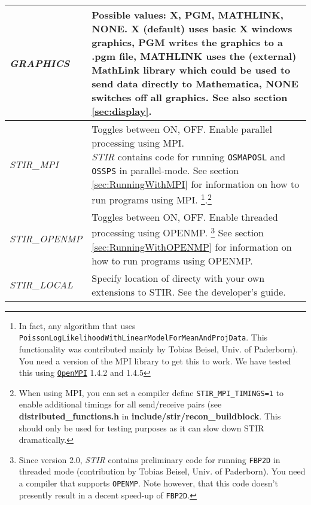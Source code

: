 \documentclass{article}
\def\R2Lurl#1#2{\mbox{\href{#1}{\tt #2}}}
\begin{document}
\begin{longtable}{|p{\MakeTableFirstCol}|p{\MakeTableSecondCol}|}
\hline
{\raggedright \textit{GRAPHICS}} & 
{\raggedright Possible values: X, PGM, MATHLINK, NONE. X (default) uses basic 
X windows graphics, PGM writes the graphics to a .pgm file, MATHLINK 
uses the (external) MathLink library which could be used to send 
data directly to Mathematica, NONE switches off all graphics. See also section \ref{sec:display}.
} \\
\hline
{\raggedright \textit{STIR\_MPI}} & 
{\raggedright Toggles between ON, OFF. Enable parallel processing using MPI.\\
\textit{STIR} contains code for running \texttt{OSMAPOSL} and \texttt{OSSPS} in parallel-mode. 
See section \ref{sec:RunningWithMPI} for information on how to run programs using MPI.
\footnote{In fact, any algorithm that uses \texttt{PoissonLogLikelihoodWithLinearModelForMeanAndProjData}.
This functionality was contributed mainly by Tobias Beisel, Univ. of Paderborn). You need a version of the MPI library 
to get this to work. We have tested this using \R2Lurl{http://www.open-mpi.org/}{OpenMPI} 1.4.2 and 1.4.5}.\footnote{
{When using MPI, you can set a compiler define \texttt{STIR\_MPI\_TIMINGS=1}} to
enable additional timings for all send/receive pairs 
(see \textbf{distributed\_functions.h} in \textbf{include/stir/recon\_buildblock}. 
This should only be used for testing purposes as it can slow down
STIR dramatically.}
} \\
\hline
{\raggedright \textit{STIR\_OPENMP}} & 
{\raggedright Toggles between ON, OFF. Enable threaded processing using OPENMP.
\footnote{Since version 2.0, \textit{STIR} contains preliminary code for running \texttt{FBP2D} in threaded mode
(contribution by Tobias Beisel, Univ. of Paderborn). You need a compiler that 
supports \texttt{OPENMP}. Note however, that this code doesn't presently result 
in a decent speed-up of \texttt{FBP2D}.}
See section \ref{sec:RunningWithOPENMP} for information on how to run programs using OPENMP.
} \\
\hline
{\raggedright \textit{STIR\_LOCAL}} & 
{\raggedright Specify location of directy with your own extensions to STIR. See
the developer's guide.}\\
\hline
\end{longtable}
\end{document}
